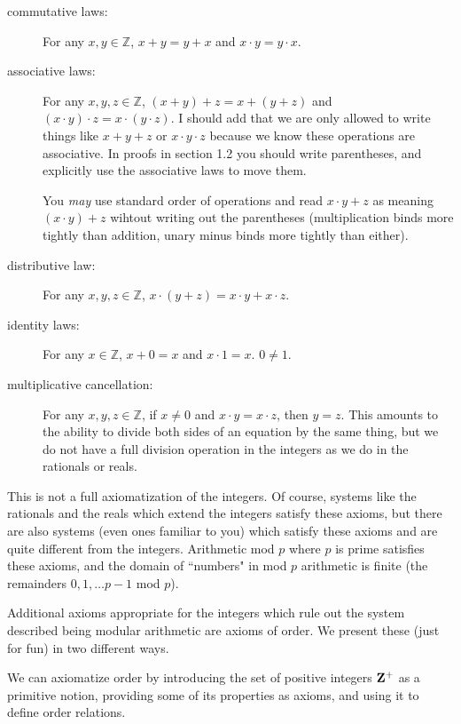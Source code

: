 \documentclass[12pt]{article}
\begin{document}
\begin{description}

\item[commutative laws:]  For any $x,y \in {\mathbb Z}$, $x+y=y+x$ and $x \cdot y = y \cdot x$.

\item[associative laws:]  For any $x,y,z \in {\mathbb Z}$, $(x+y)+z = x+(y+z)$ and $(x \cdot y)\cdot z = x \cdot(y\cdot z)$.  I should add that we are only allowed to write things like $x+y+z$ or $x \cdot y \cdot z$ because we know these operations are associative.  In proofs in section 1.2 you should write parentheses, and explicitly use the associative laws to move them.

You {\em may\/} use standard order of operations and read $x \cdot y + z$ as meaning $(x \cdot y) + z$ wihtout writing out the parentheses (multiplication binds more tightly than addition, unary minus binds more tightly than either).

\item[distributive law:]  For any $x,y,z \in {\mathbb Z}$, $x\cdot(y+z) = x \cdot y + x \cdot z$.

\item[identity laws:]  For any $x \in {\mathbb Z}$, $x+0=x$ and $x \cdot 1 = x$.  $0 \neq 1$.

\item[multiplicative cancellation:]  For any $x,y,z \in {\mathbb Z}$, if $x \neq 0$ and $x\cdot y = x\cdot z$, then $y=z$.
This amounts to the ability to divide both sides of an equation by the same thing, but we do not have a full division operation in the integers as we do in the rationals or reals.

\end{description}

This is not a full axiomatization of the integers.  Of course, systems like the rationals and the reals which extend the integers
satisfy these axioms, but there are also systems (even ones familiar to you) which satisfy these axioms and are quite different from the integers.  Arithmetic mod $p$ where $p$ is prime satisfies these axioms, and the domain of ``numbers" in mod $p$ arithmetic is finite (the remainders $0,1,\ldots p-1$ mod $p$).

Additional axioms appropriate for the integers which rule out the system described being modular arithmetic are axioms of order.  We present these (just for fun) in two different ways.

We can axiomatize order by introducing the set of positive integers ${\bf Z}^+$ as a primitive notion, providing some of its properties as axioms, and using it to define order relations.
\end{document}
